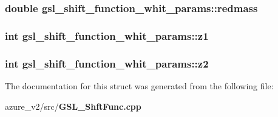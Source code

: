 \subsubsection{\setlength{\rightskip}{0pt plus 5cm}double \bf{gsl\_\-shift\_\-function\_\-whit\_\-params::redmass}}\label{structgsl__shift__function__whit__params_e46bd1c9a97636cfe0a8786420b140f7}


\subsubsection{\setlength{\rightskip}{0pt plus 5cm}int \bf{gsl\_\-shift\_\-function\_\-whit\_\-params::z1}}\label{structgsl__shift__function__whit__params_f25cf198c468d215c956c3e88461a5a9}


\subsubsection{\setlength{\rightskip}{0pt plus 5cm}int \bf{gsl\_\-shift\_\-function\_\-whit\_\-params::z2}}\label{structgsl__shift__function__whit__params_86cfe88c2ce5dbd8e202b8bdb849ba68}




The documentation for this struct was generated from the following file:\begin{CompactItemize}
\item 
azure\_\-v2/src/\bf{GSL\_\-Shft\-Func.cpp}\end{CompactItemize}
